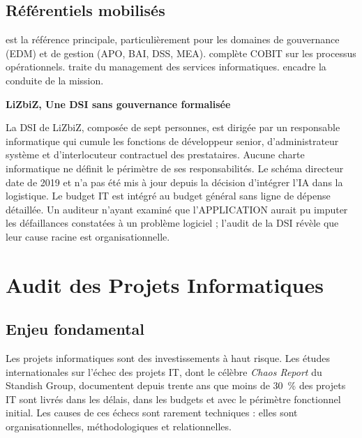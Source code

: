 \subsection{Référentiels mobilisés}

 est la référence principale, particulièrement pour les domaines de gouvernance (EDM) et de gestion (APO, BAI, DSS, MEA).  complète COBIT sur les processus opérationnels.  traite du management des services informatiques.  encadre la conduite de la mission.

\begin{boxlizbiz}
\textbf{LiZbiZ, Une DSI sans gouvernance formalisée}

La DSI de LiZbiZ, composée de sept personnes, est dirigée par un responsable informatique qui cumule les fonctions de développeur senior, d'administrateur système et d'interlocuteur contractuel des prestataires. Aucune charte informatique ne définit le périmètre de ses responsabilités. Le schéma directeur date de 2019 et n'a pas été mis à jour depuis la décision d'intégrer l'IA dans la logistique. Le budget IT est intégré au budget général sans ligne de dépense détaillée. Un auditeur n'ayant examiné que l'APPLICATION aurait pu imputer les défaillances constatées à un problème logiciel ; l'audit de la DSI révèle que leur cause racine est organisationnelle.
\end{boxlizbiz}


\section{Audit des Projets Informatiques}

\subsection{Enjeu fondamental}

Les projets informatiques sont des investissements à haut risque. Les études internationales sur l'échec des projets IT, dont le célèbre \textit{Chaos Report} du Standish Group, documentent depuis trente ans que moins de 30~\% des projets IT sont livrés dans les délais, dans les budgets et avec le périmètre fonctionnel initial. Les causes de ces échecs sont rarement techniques : elles sont organisationnelles, méthodologiques et relationnelles.

